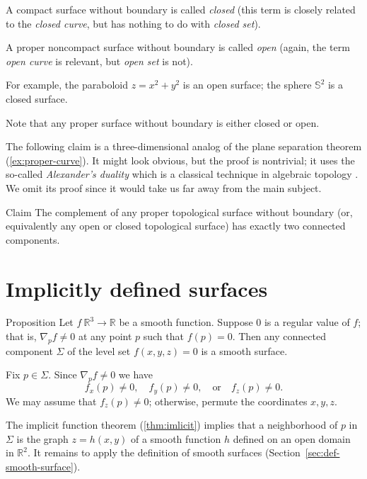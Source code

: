 A compact surface without boundary is called \emph{closed}
(this term is closely related to the {}\emph{closed curve}, but has nothing to do with {}\emph{closed set}).

A proper noncompact surface without boundary is called \emph{open} (again, the term {}\emph{open curve} is relevant, but {}\emph{open set} is not).

For example, the paraboloid $z=x^2+y^2$
is an open surface; the 
sphere $\mathbb{S}^2$ is a closed surface.

Note that any proper surface without boundary is either closed or open.

The following claim is a three-dimensional analog of the plane separation theorem (\ref{ex:proper-curve}).
It might look obvious, but the proof is nontrivial; it uses the so-called {}\emph{Alexander's duality} which is a classical technique in algebraic topology \cite[see][]{hatcher}.
We omit its proof since it would take us far away from the main subject.

\begin{thm}{Claim}\label{clm:proper-divides}
The complement of any proper topological surface without boundary (or, equivalently any open or closed topological surface) has exactly two connected components. 
\end{thm}

\section{Implicitly defined surfaces}

\begin{thm}{Proposition}\label{prop:implicit-surface}
Let $f\:\mathbb{R}^3\to \mathbb{R}$ be a smooth function.
Suppose $0$ is a regular value of $f$;
that is, $\nabla_p f\ne 0$ at any point $p$ such that $f(p)=0$.
Then any connected component $\Sigma$ of the level set  $f(x,y,z)=0$ is a smooth surface.
\end{thm}

Fix $p\in\Sigma$.
Since $\nabla_p f\ne 0$ we have 
\[f_x(p)\ne 0,\quad f_y(p)\ne 0,\quad \text{or}\quad f_z(p)\ne 0.\]
We may assume that $f_z(p)\ne 0$;
otherwise, permute the coordinates $x,y,z$.

The implicit function theorem (\ref{thm:imlicit}) implies that a neighborhood of $p$ in $\Sigma$ is the graph $z=h(x,y)$ of a smooth function $h$ defined on an open domain in $\mathbb{R}^2$.
It remains to apply the definition of smooth surfaces (Section~\ref{sec:def-smooth-surface}).
\qeds

